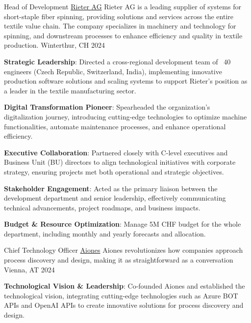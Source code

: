 
\begin{cventries}
  \cventry
    {Head of Development} %
    {\href{https://www.rieter.com}{Rieter AG}} %
    {Rieter AG is a leading supplier of systems for short-staple fiber spinning, providing solutions and services across the entire textile value chain. The company specializes in machinery and technology for spinning, and downstream processes to enhance efficiency and quality in textile production.} %
    {Winterthur, CH} %
    {2024} %
    {
        \begin{cvitems}
            \item {\textbf{Strategic Leadership}: Directed a cross-regional development team of ~40 engineers (Czech Republic, Switzerland, India), implementing innovative production software solutions and scaling systems to support Rieter’s position as a leader in the textile manufacturing sector.}
            \item {\textbf{Digital Transformation Pioneer}: Spearheaded the organization’s digitalization journey, introducing cutting-edge technologies to optimize machine functionalities, automate maintenance processes, and enhance operational efficiency.}
            \item {\textbf{Executive Collaboration}: Partnered closely with C-level executives and Business Unit (BU) directors to align technological initiatives with corporate strategy, ensuring projects met both operational and strategic objectives.}
            \item {\textbf{Stakeholder Engagement}: Acted as the primary liaison between the development department and senior leadership, effectively communicating technical advancements, project roadmaps, and business impacts.}
            \item {\textbf{Budget \& Resource Optimization}: Manage 5M CHF budget for the whole department, including monthly and yearly forecasts and allocation.}
        \end{cvitems}
    }
  \cventry
  {Chief Technology Officer} %
  {\href{https://www.aiones.ai}{Aiones}} %
  {Aiones revolutionizes how companies approach process discovery and design, making it as straightforward as a conversation} %
  {Vienna, AT} %
  {2024} %
  {
    \begin{cvitems} %
      \item {\textbf{Technological Vision \& Leadership}: Co-founded Aiones and established the technological vision, integrating cutting-edge technologies such as Azure BOT APIs and OpenAI APIs to create innovative solutions for process discovery and design.}

\end{cvitems}}
\end{cventries}
